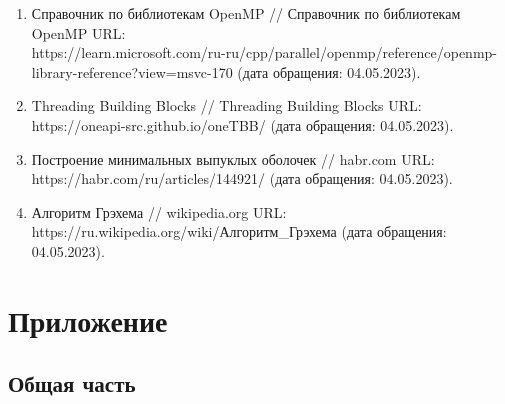 \documentclass[14pt, a4paper]{extarticle}
\begin{document}
    \begin{enumerate}
        \item Справочник по библиотекам OpenMP // Справочник по библиотекам OpenMP URL: \\https://learn.microsoft.com/ru-ru/cpp/parallel/openmp/reference/openmp-library-reference?view=msvc-170 (дата обращения: 04.05.2023).
        \item Threading Building Blocks // Threading Building Blocks URL: https://oneapi-src.github.io/oneTBB/ (дата обращения: 04.05.2023).
        \item Построение минимальных выпуклых оболочек // habr.com URL:\\ https://habr.com/ru/articles/144921/ (дата обращения: 04.05.2023).
        \item  Алгоритм Грэхема // wikipedia.org URL:\\ https://ru.wikipedia.org/wiki/Алгоритм\_Грэхема (дата обращения: 04.05.2023). 
    \end{enumerate}

  \newpage

  \section{Приложение}

  \subsection{Общая часть}
\end{document}
